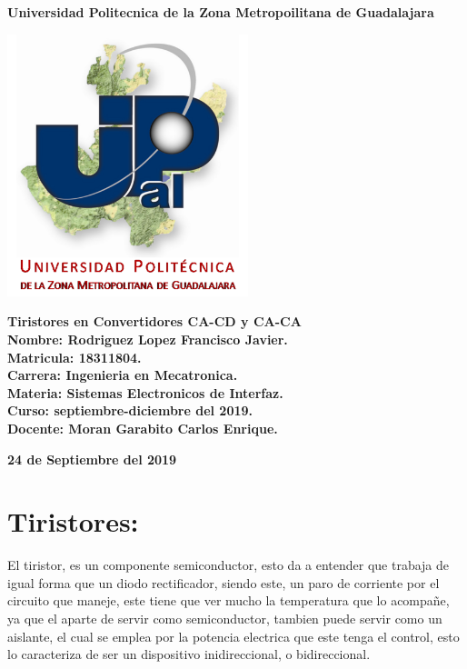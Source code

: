\documentclass[12pt,a4paper]{article}
\author{Rodriguez Lopez Francisco Javier}
\begin{document}
\begin{center}
\LARGE \textbf{Universidad Politecnica de la Zona Metropoilitana de Guadalajara\\}


\includegraphics[width=7cm]{UpzmgD.png}  

\LARGE \textbf{Tiristores en Convertidores CA-CD y CA-CA}\\
\vspace{2cm}
\large \textbf{Nombre: Rodriguez Lopez Francisco Javier.\\
\vspace{0.5cm} Matricula: 18311804.\\
\vspace{0.5cm} Carrera: Ingenieria en Mecatronica.\\
\vspace{0.5cm} Materia: Sistemas Electronicos de Interfaz.\\
\vspace{0.5cm} Curso: septiembre-diciembre del 2019.\\
\vspace{0.5cm} Docente: Moran Garabito Carlos Enrique.}


\vspace{6cm}
\small \textbf{24 de Septiembre del 2019}
\end{center}

\section{Tiristores:}
El tiristor, es un componente semiconductor, esto da a entender que trabaja de igual forma que un diodo rectificador, siendo este, un paro de corriente por el circuito que maneje, este tiene que ver mucho la temperatura que lo acompañe, ya que el aparte de servir como semiconductor, tambien puede servir como un aislante, el cual se emplea por la potencia electrica que este tenga el control, esto lo caracteriza de ser un dispositivo inidireccional, o bidireccional.
\end{document}
